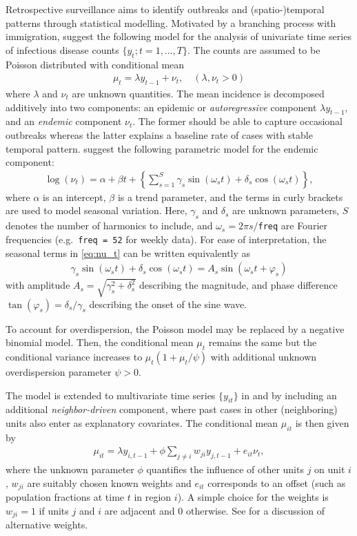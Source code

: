 \documentclass[a4paper,11pt]{article}
\newcommand{\code}[1]{\texttt{#1}}
\begin{document}
Retrospective surveillance aims to identify outbreaks and (spatio-)temporal
patterns through statistical modelling. Motivated by a branching process
with immigration, \cite{held-etal-2005} suggest the following model
for the analysis of univariate time series of infectious disease counts 
$\{y_{t}; t=1,\ldots,T\}$.
The counts are assumed to be Poisson distributed with conditional mean
\begin{align*}
  \mu_{t} = \lambda y_{t-1}+ \nu_{t}, \quad(\lambda,\nu_{t}>0)
\end{align*}
where $\lambda$ and $\nu_t$ are unknown quantities.
The mean incidence is decomposed additively into two components: an
epidemic or \emph{autoregressive} component $\lambda y_{t-1}$, and
an \emph{endemic} component $\nu_t$. The former should be able to capture
occasional outbreaks whereas the latter explains a baseline rate of cases
with stable temporal pattern. 
\cite{held-etal-2005} suggest the following parametric model for the endemic 
component:
\begin{align}\label{eq:nu_t}
  \log(\nu_t) =\alpha + \beta t +
              \left\{\sum_{s=1}^S \gamma_s \sin(\omega_s t) + \delta_s \cos(\omega_s t)\right\},
\end{align}
where $\alpha$ is an intercept, $\beta$ is a trend parameter, and the terms
in curly brackets are used to model seasonal variation. Here, $\gamma_s$ and
$\delta_s$ are unknown parameters, $S$ denotes the number of harmonics to 
include, and $\omega_s=2\pi s/$\code{freq} are Fourier frequencies (e.g.\
\code{freq = 52} for weekly data).
For ease of interpretation, the seasonal terms in \eqref{eq:nu_t} can be
written equivalently as 
\begin{align*}
 \gamma_s \sin(\omega_s t) + \delta_s \cos(\omega_s t)= A_s \sin(\omega_s t +\varphi_s)
\end{align*}
with amplitude $A_s=\sqrt{\gamma_s^2+\delta_s^2}$
describing the magnitude, and phase difference $\tan(\varphi_s)=\delta_s/\gamma_s$ 
describing the onset of the sine wave.

To account for overdispersion, the Poisson model may be replaced by
a negative binomial model. Then, the conditional mean $\mu_t$ remains
the same but the conditional variance increases to $\mu_t (1+\mu_t/\psi)$
with additional unknown overdispersion parameter $\psi>0$.

The model is extended to multivariate time series $\{y_{it}\}$ in 
\cite{held-etal-2005} and \cite{paul-etal-2008} by including an additional 
\emph{neighbor-driven} component, where past cases in other (neighboring) 
units also enter as explanatory covariates. The conditional mean $\mu_{it}$ 
is then given by
\begin{align} \label{eq:mu_it}
  \mu_{it} = \lambda y_{i,t-1} + \phi \sum_{j\neq i} w_{ji} y_{j,t-1} +e_{it} \nu_{t},
\end{align}
where the unknown parameter $\phi$ quantifies the influence of other units $j$ 
on unit $i$, $w_{ji}$ are suitably chosen known weights and $e_{it}$
corresponds to an offset (such as population fractions at time $t$ in region $i$).
A simple choice for the weights is $w_{ji}=1$ if units $j$ and $i$ are adjacent
and 0 otherwise. See \cite{paul-etal-2008} for a discussion of alternative
weights.
\end{document}
